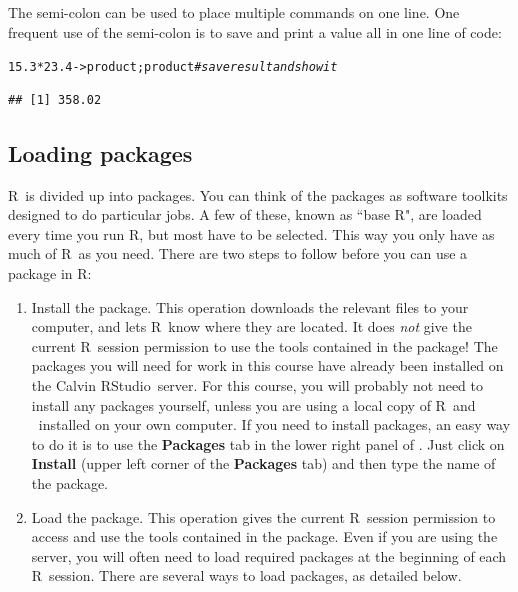 \documentclass[twoside]{book}\usepackage[]{graphicx}\usepackage[]{xcolor}
\makeatletter
\newcommand{\hlnum}[1]{\textcolor[rgb]{0.686,0.059,0.569}{#1}}%
\newcommand{\hlcom}[1]{\textcolor[rgb]{0.678,0.584,0.686}{\textit{#1}}}%
\newcommand{\hlopt}[1]{\textcolor[rgb]{0,0,0}{#1}}%
\newcommand{\hlstd}[1]{\textcolor[rgb]{0.345,0.345,0.345}{#1}}%
\newcommand{\hlkwb}[1]{\textcolor[rgb]{0.69,0.353,0.396}{#1}}%
\newenvironment{kframe}{%
 \def\at@end@of@kframe{}%
 \ifinner\ifhmode%
  \def\at@end@of@kframe{\end{minipage}}%
  \begin{minipage}{\columnwidth}%
 \fi\fi%
 \def\FrameCommand##1{\hskip\@totalleftmargin \hskip-\fboxsep
 \colorbox{shadecolor}{##1}\hskip-\fboxsep
     \hskip-\linewidth \hskip-\@totalleftmargin \hskip\columnwidth}%
 \MakeFramed {\advance\hsize-\width
   \@totalleftmargin\z@ \linewidth\hsize
   \@setminipage}}%
 {\par\unskip\endMakeFramed%
 \at@end@of@kframe}
\newenvironment{knitrout}{}{} %
\def\R{{\sf R}}
\def\Rstudio{{\sf RStudio}}
\makeatother
\begin{document}
The semi-colon can be used to place multiple commands on one line.  
One frequent use of the semi-colon is to save and print a value all 
in one line of code:
\begin{knitrout}
\color{fgcolor}\begin{kframe}
\begin{alltt}
\hlnum{15.3} \hlopt{*} \hlnum{23.4} \hlkwb{->} \hlstd{product; product}    \hlcom{# save result and show it}
\end{alltt}
\begin{verbatim}
## [1] 358.02
\end{verbatim}
\end{kframe}
\end{knitrout}

\subsection{Loading packages}

\R\ is divided up into packages.  You can think of the packages as software toolkits designed to do 
particular jobs.  A few of these, known as ``base \R", are loaded every time you
run \R, but most have to be selected.  This way you only have as much of \R\ as you
need.  There are two steps to follow before you can use a package in \R :

\begin{enumerate}
\item{Install the package.} This operation downloads the relevant files to your computer, and lets \R\ know where they are located.  It does \textit{not} give the current \R\ session permission to use the tools contained in the package!  The packages you will need for work in this course have already been installed on the Calvin \Rstudio\ server. For this course, you will probably not need to install any packages yourself, unless you are using a local copy of \R\ and \RStudio\ installed on your own computer.  If you need to install packages, an easy way to do it is to use the \textbf{Packages} tab in the lower right panel of \RStudio. Just click on \textbf{Install} (upper left corner of the \textbf{Packages} tab) and then type the name of the package.
\item{Load the package.} This operation gives the current \R\ session permission to access and use the tools contained in the package.  Even if you are using the \RStudio server, you will often need to load required packages at the beginning of each \R\ session.  There are several ways to load packages, as detailed below.
\end{enumerate}
\end{document}
